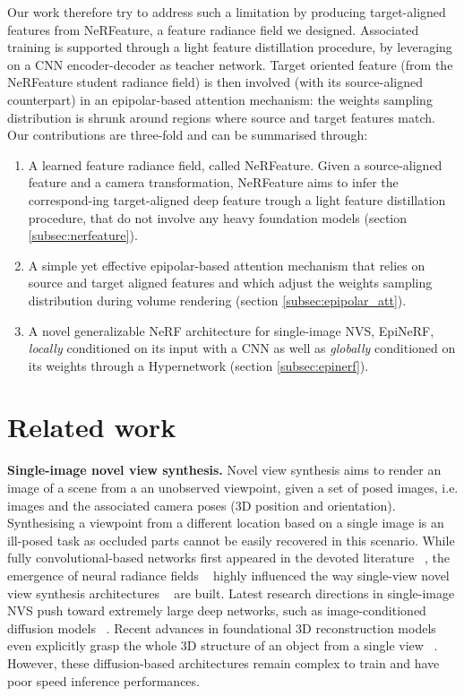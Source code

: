 Our work therefore try to address such a limitation by producing target-aligned features from NeRFeature, a feature radiance field we designed. Associated training is supported through a light feature distillation procedure, by leveraging on a CNN encoder-decoder as teacher network. Target oriented feature (from the NeRFeature student radiance field) is then involved (with its source-aligned counterpart) in an epipolar-based attention mechanism: the weights sampling distribution is shrunk around regions where source and target features match. Our contributions are three-fold and can be summarised through: 
\begin{enumerate}
   \item A learned feature radiance field, called NeRFeature. Given a source-aligned feature and a camera transformation, NeRFeature aims to infer the correspond\--ing target-aligned deep feature trough a light feature distillation procedure, that do not involve any heavy foundation models (section \ref{subsec:nerfeature}). 
    \item A simple yet effective epipolar-based attention mechanism that relies on source and target aligned features and which adjust the weights sampling distribution during volume rendering (section \ref{subsec:epipolar_att}). 
    \item A novel generalizable NeRF architecture for single-image NVS, EpiNeRF, \textit{locally} conditioned on its input with a CNN as well as \textit{globally} conditioned on its weights through a Hypernetwork (section \ref{subsec:epinerf}).  
    
\end{enumerate}

\section{Related work}

\noindent\textbf{Single-image novel view synthesis.} Novel view synthesis aims to render an image of a scene from a an unobserved viewpoint, given a set of posed images, i.e. images and the associated camera poses (3D position and orientation). Synthesising a viewpoint from a different location based on a single image is an ill-posed task as occluded parts cannot be easily recovered in this scenario. While fully convolutional-based networks first appeared in the devoted literature ~\citep{kim2020novel,hou2021novel,guo2022fast,landreau2022epipolarnvs}, the emergence of neural radiance fields ~\citep{mildenhall2020nerf} highly influenced the way single-view novel view synthesis architectures ~\citep{yu2021pixelnerf,li2022symmnerf,lin2023vision} are built. Latest research directions in single-image NVS push toward extremely large deep networks, such as image-conditioned diffusion models ~\citep{chen2023single,gu2023nerfdiff,chan2023genvs}. Recent advances in foundational 3D reconstruction models  even explicitly grasp the whole 3D structure of an object from a single view ~\citep{liu2023zero,zou2023triplane}. However, these diffusion-based architectures remain complex to train and have poor speed inference performances.  

